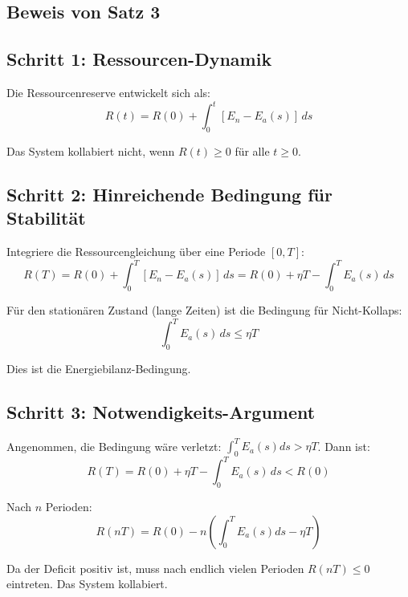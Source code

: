 \documentclass[a4paper, 12pt, twoside, openright]{report}
\theoremstyle{definition}
\theoremstyle{definition}
\begin{document}
\subsection{Beweis von Satz 3}

\subsection{Schritt 1: Ressourcen-Dynamik}

Die Ressourcenreserve entwickelt sich als:
\begin{equation}
    R(t) = R(0) + \int_0^t [E_n - E_a(s)] \, ds
\end{equation}

Das System kollabiert nicht, wenn $R(t) \geq 0$ für alle $t \geq 0$.

\subsection{Schritt 2: Hinreichende Bedingung für Stabilität}

Integriere die Ressourcengleichung über eine Periode $[0, T]$:
\begin{equation}
    R(T) = R(0) + \int_0^T [E_n - E_a(s)] \, ds = R(0) + \eta T - \int_0^T E_a(s) \, ds
\end{equation}

Für den stationären Zustand (lange Zeiten) ist die Bedingung für Nicht-Kollaps:
\begin{equation}
    \int_0^T E_a(s) \, ds \leq \eta T
\end{equation}

Dies ist die Energiebilanz-Bedingung.

\subsection{Schritt 3: Notwendigkeits-Argument}

Angenommen, die Bedingung wäre verletzt: $\int_0^T E_a(s) ds > \eta T$. Dann ist:
\begin{equation}
    R(T) = R(0) + \eta T - \int_0^T E_a(s) \, ds < R(0)
\end{equation}

Nach $n$ Perioden:
\begin{equation}
    R(nT) = R(0) - n \left(\int_0^T E_a(s) ds - \eta T\right)
\end{equation}

Da der Deficit positiv ist, muss nach endlich vielen Perioden $R(nT) \leq 0$ eintreten. Das System kollabiert.
\end{document}
